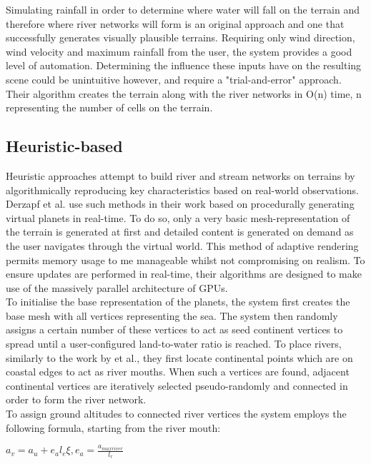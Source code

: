 Simulating rainfall in order to determine where water will fall on the terrain and therefore where river networks will form is an original approach and one that successfully generates visually plausible terrains. Requiring only wind direction, wind velocity and maximum rainfall from the user, the system provides a good level of automation. Determining the influence these inputs have on the resulting scene could be unintuitive however, and require a "trial-and-error" approach. Their algorithm creates the terrain along with the river networks in O(n) time, n representing the number of cells on the terrain.

\subsection{Heuristic-based}

Heuristic approaches attempt to build river and stream networks on terrains by algorithmically reproducing key characteristics based on real-world observations. \\

Derzapf et al. \cite{Derzapf2011} use such methods in their work based on procedurally generating virtual planets in real-time. To do so, only a very basic mesh-representation of the terrain is generated at first and detailed content is generated on demand as the user navigates through the virtual world. This method of adaptive rendering permits memory usage to me manageable whilst not compromising on realism. To ensure updates are performed in real-time, their algorithms are designed to make use of the massively parallel architecture of GPUs. \\
To initialise the base representation of the planets, the system first creates the base mesh with all vertices representing the sea. The system then randomly assigns a certain number of these vertices to act as seed continent vertices to spread until a user-configured land-to-water ratio is reached.
To place rivers, similarly to the work by \cite{Genevaux2013} et al., they first locate continental points which are on coastal edges to act as river mouths. When such a vertices are found, adjacent continental vertices are iteratively selected pseudo-randomly and connected in order to form the river network. \\
To assign ground altitudes to connected river vertices the system employs the following formula, starting from the river mouth:

\begin{center}
$a_{v} = a_{u} + e_{a}l_{e}\xi , e_{a} = \frac{a_{maxriver}}{l_{r}} $ \\
\end{center}

